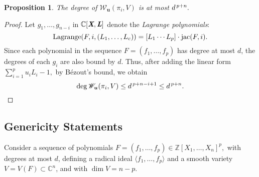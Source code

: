 \documentclass[a4paper]{article}
\def\Lb{\textit{\textbf{L}}}
\def\Xb{\textit{\textbf{X}}}
\def\ub{{\bm u}}
\DeclareMathOperator{\jac}{jac}
\DeclareMathOperator{\lag}{Lagrange}
\newcommand{\ZZ}{{\mathbb{Z}}}
\def\C{\mathbb{C}}
\def\lagF{{\bm\lag}(F,i,(L_1,\hdots,L_c))}
\def\Wil{\mathscr{W}_{\ub}(\pi_i,V)}
\newtheorem{prop}[theorem]{Proposition}
\begin{document}
%
%
%
\vspace{2mm}
\begin{prop}
The degree of $\Wil$ is at most $d^{\hspace{.5mm}p+n}.$
\end{prop}
\begin{proof}
Let $g_1,\hdots,g_{n-i}$ in $\C[\Xb,\Lb]$ denote the \textit{Lagrange polynomials}:
\[
\lagF = [L_1 \cdots L_p]\cdot \jac (F,i).
\]
Since each polynomial in the sequence $F=(f_1,\hdots,f_p)$ has degree at most $d$, the degrees of each $g_i$ are also bound by $d.$  Thus, after adding the linear form $\sum_{i=1}^pu_iL_i-1,$ by B\'ezout's bound, we obtain
\[
\deg \Wil \leq d^{\hspace{.5mm}p+n-i+1} \leq d^{\hspace{.5mm}p+n}. 
\]
\end{proof}
%







\subsection{Genericity Statements}\label{sec:gen}
Consider a sequence of polynomials $F= (f_1,\hdots,f_p) \in \ZZ[X_1,\hdots,X_n]^p,$ with degrees at most $d$, defining a radical ideal $\langle f_1,\hdots, f_p \rangle $ and a smooth variety $V=V(F) \subset \C^n$, and with $\dim V = n-p$. %
%
%
\end{document}
